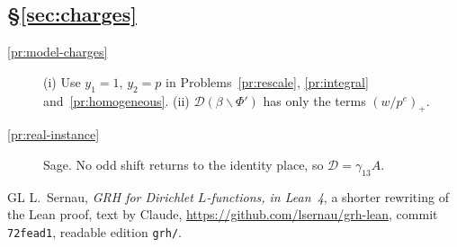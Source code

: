\documentclass[reqno]{amsart}
\theoremstyle{plain}
\theoremstyle{definition}
\theoremstyle{remark}
\newcommand{\Dc}{\mathcal{D}}
\begin{document}
\subsection*{\S\ref{sec:charges}}
\begin{description}
\item[\ref{pr:model-charges}] (i) Use \(y_1 = 1\), \(y_2 = p\) in Problems~\ref{pr:rescale}, \ref{pr:integral} and~\ref{pr:homogeneous}.  (ii) \(\Dc(\beta \smallsetminus \Phi')\) has only the terms \((w/p^e)_+\).
\item[\ref{pr:real-instance}] Sage.  No odd shift returns to the identity place, so \(\Dc = \gamma_{13} A\).
\end{description}

\begin{thebibliography}{GL}
 L.~Sernau, \emph{GRH for Dirichlet \(L\)-functions, in Lean~4}, a shorter rewriting of the Lean proof, text by Claude, \url{https://github.com/lsernau/grh-lean}, commit \texttt{72fead1}, readable edition \texttt{grh/}.
\end{thebibliography}
\end{document}
